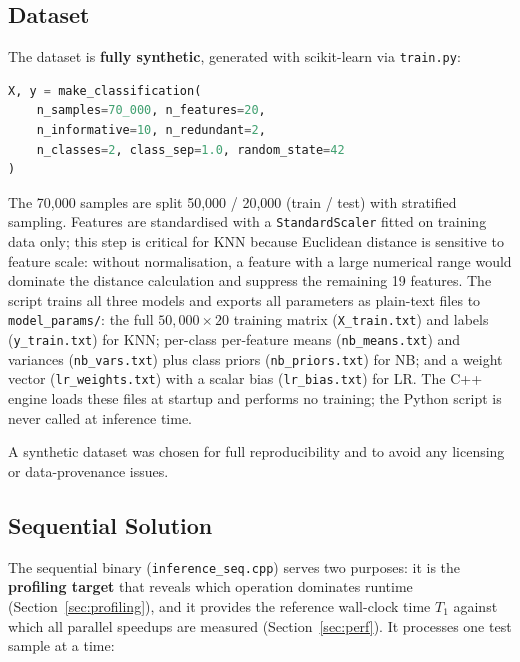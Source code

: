 \documentclass[12pt,a4paper]{article}
\begin{document}
\subsection{Dataset}

The dataset is \textbf{fully synthetic}, generated with scikit-learn via
\texttt{train.py}:

\begin{lstlisting}[language=Python]
X, y = make_classification(
    n_samples=70_000, n_features=20,
    n_informative=10, n_redundant=2,
    n_classes=2, class_sep=1.0, random_state=42
)
\end{lstlisting}

The 70{,}000 samples are split 50{,}000 / 20{,}000 (train / test) with
stratified sampling. Features are standardised with a \texttt{StandardScaler}
fitted on training data only; this step is critical for KNN because Euclidean
distance is sensitive to feature scale: without normalisation, a feature with a
large numerical range would dominate the distance calculation and suppress the
remaining 19 features. The script trains all three models and exports all parameters as plain-text
files to \texttt{model\_params/}: the full $50{,}000\times20$ training
matrix (\texttt{X\_train.txt}) and labels (\texttt{y\_train.txt}) for KNN;
per-class per-feature means (\texttt{nb\_means.txt}) and variances
(\texttt{nb\_vars.txt}) plus class priors (\texttt{nb\_priors.txt}) for NB;
and a weight vector (\texttt{lr\_weights.txt}) with a scalar bias
(\texttt{lr\_bias.txt}) for LR. The C++ engine loads these files at
startup and performs no training; the Python script is never called at
inference time.

A synthetic dataset was chosen for full reproducibility and to avoid any
licensing or data-provenance issues.

\subsection{Sequential Solution}
\label{sec:sequential}

The sequential binary (\texttt{inference\_seq.cpp}) serves two purposes:
it is the \textbf{profiling target} that reveals which operation dominates
runtime (Section~\ref{sec:profiling}), and it provides the reference
wall-clock time $T_1$ against which all parallel speedups are measured
(Section~\ref{sec:perf}). It processes one test sample at a time:
\end{document}
